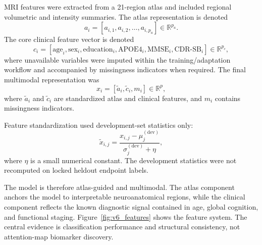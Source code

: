 MRI features were extracted from a 21-region atlas and included regional volumetric and intensity summaries. The atlas representation is denoted
\begin{equation}
a_i = \left[a_{i,1},a_{i,2},\ldots,a_{i,p_a}\right] \in \mathbb{R}^{p_a}.
\label{eq:atlas_features}
\end{equation}
The core clinical feature vector is denoted
\begin{equation}
c_i = \left[\mathrm{age}_i,\mathrm{sex}_i,\mathrm{education}_i,\mathrm{APOE4}_i,\mathrm{MMSE}_i,\mathrm{CDR\mbox{-}SB}_i\right] \in \mathbb{R}^{p_c},
\label{eq:clinical_features}
\end{equation}
where unavailable variables were imputed within the training/adaptation workflow and accompanied by missingness indicators when required. The final multimodal representation was
\begin{equation}
x_i = \left[\tilde{a}_i,\tilde{c}_i,m_i\right] \in \mathbb{R}^{p},
\label{eq:feature_concat}
\end{equation}
where $\tilde{a}_i$ and $\tilde{c}_i$ are standardized atlas and clinical features, and $m_i$ contains missingness indicators.

Feature standardization used development-set statistics only:
\begin{equation}
\tilde{x}_{i,j} =
\frac{x_{i,j}-\mu_j^{(\mathrm{dev})}}{\sigma_j^{(\mathrm{dev})}+\eta},
\label{eq:standardization}
\end{equation}
where $\eta$ is a small numerical constant. The development statistics were not recomputed on locked heldout endpoint labels.

The model is therefore atlas-guided and multimodal. The atlas component anchors the model to interpretable neuroanatomical regions, while the clinical component reflects the known diagnostic signal contained in age, global cognition, and functional staging. Figure~\ref{fig:v6_features} shows the feature system. The central evidence is classification performance and structural consistency, not attention-map biomarker discovery.

